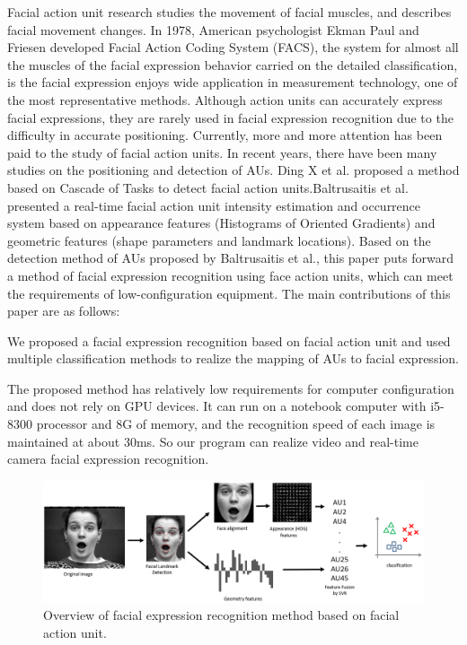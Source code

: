 \documentclass[10pt, conference, compsocconf]{IEEEtran}
\begin{document}
Facial action unit research studies the movement of facial muscles\cite{Hager1985A}, and describes facial movement changes. In 1978, American psychologist Ekman Paul and Friesen\cite{friesen1978facial} developed Facial Action Coding System (FACS), the system for almost all the muscles of the facial expression behavior carried on the detailed classification, is the facial expression enjoys wide application in measurement technology, one of the most representative methods. Although action units can accurately express facial expressions, they are rarely used in facial expression recognition due to the difficulty in accurate positioning. Currently, more and more attention has been paid to the study of facial action units. In recent years, there have been many studies on the positioning and detection of AUs. Ding X\cite{Ding2013Facial} et al. proposed a method based on Cascade of Tasks to detect facial action units.Baltrusaitis\cite{Baltrusaitis2015Cross} et al. presented a real-time facial action unit intensity estimation and occurrence system based on appearance features (Histograms of Oriented Gradients) and geometric features (shape parameters and landmark locations). Based on the detection method of AUs proposed by Baltrusaitis et al., this paper puts forward a method of facial expression recognition using face action units, which can meet the requirements of low-configuration equipment. The main contributions of this paper are as follows:

We proposed a facial expression recognition based on facial action unit and used multiple classification methods to realize the mapping of AUs to facial expression.

The proposed method has relatively low requirements for computer configuration and does not rely on GPU devices. It can run on a notebook computer with i5-8300 processor and 8G of memory, and the recognition speed of each image is maintained at about 30ms. So our program can realize video and real-time camera facial expression recognition.

\begin{figure}[h]
	\centering
	\includegraphics[width=\textwidth]{framework}
	\caption{Overview of facial expression recognition method based on facial action unit.}
\end{figure}
\end{document}
